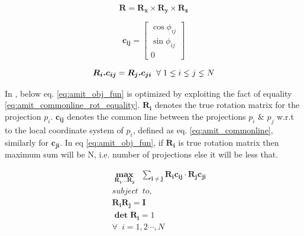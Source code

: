 \documentclass{report}
\begin{document}
 \begin{equation} \label{eq:rotation_xyz}
     \boldsymbol{R}  =   \boldsymbol{R_x} \times \boldsymbol{R_y} \times \boldsymbol{R_z}
 \end{equation}
 
  \begin{equation} \label{eq:amit_commonline}
     \boldsymbol{c_{ij}}  
      =  
     \begin{bmatrix}
       \cos{\phi_{ij}} \\ 
       \sin{\phi_{ij}} \\ 
       0  
     \end{bmatrix}
 \end{equation}
 
 \begin{equation} \label{eq:amit_commonline_rot_equality}
     \boldsymbol{R_i.c_{ij}}  =   \boldsymbol{R_j.c_{ji}} \hspace{0.2cm} \forall \hspace{0.1 cm}  1\lneq i \lneq j \lneq N
 \end{equation}
 
 In \cite{sigworthcryoAngleEstimate}, below eq. \ref{eq:amit_obj_fun} is optimized by exploiting the fact of equality \ref{eq:amit_commonline_rot_equality}. ${\boldsymbol{R_i}}$ denotes the true rotation matrix for the projection ${p_i}$. ${\boldsymbol{c_{ij}}}$ denotes the common line between the projections ${p_i}$ \& ${p_j}$ w.r.t to the local coordinate system of ${p_i}$, defined as eq. \ref{eq:amit_commonline}, similarly for ${\boldsymbol{c_{ji}}}$. In eq \ref{eq:amit_obj_fun}, if ${\boldsymbol{R_i}}$ is true rotation matrix then maximum sum will be N, i.e. number of projections else it will be less that. 
 
 
 \begin{equation}\label{eq:amit_obj_fun}
  \begin{aligned}
  & \enspace \boldsymbol{\max\limits_{R_1\dots R_2}} \enspace \boldsymbol{\sum\limits_{i \neq j}} \boldsymbol{R_ic_{ij}} 	\cdot \boldsymbol{R_jc_{ji}}  \\
     &  \enspace  subject \enspace to,\\
     & \enspace  \boldsymbol{R_i}\boldsymbol{R_j} =  \boldsymbol{I} \\
     & \enspace \boldsymbol{\det{R_i}}= 1 \\
     &  \enspace  \forall \enspace i = 1,2 \cdots , N\\
  \end{aligned}
\end{equation}
\end{document}
